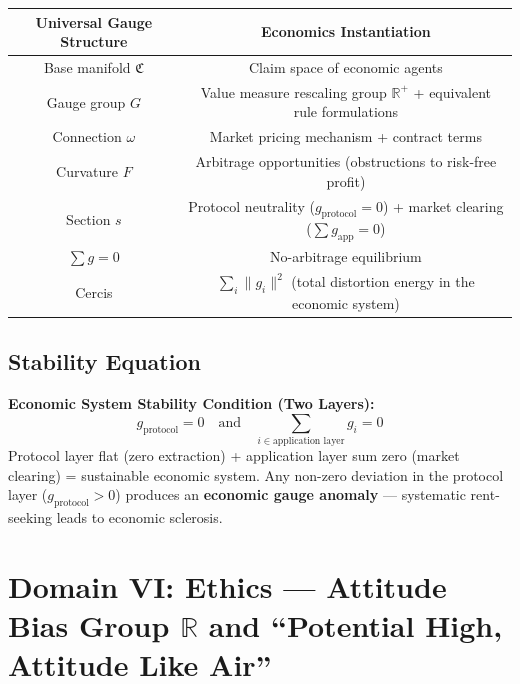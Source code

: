 \documentclass[12pt,a4paper]{article}
\theoremstyle{plain}
\theoremstyle{definition}
\newcommand{\R}{\mathbb{R}}
\newcommand{\curv}{F}
\newcommand{\conn}{\omega}
\newcommand{\ClaimSpace}{\mathfrak{C}}
\begin{document}
\begin{center}
\begin{tabular}{c|c}
    \toprule
    \textbf{Universal Gauge Structure} & \textbf{Economics Instantiation} \\
    \midrule
    Base manifold $\ClaimSpace$ & Claim space of economic agents \\
    Gauge group $G$ & Value measure rescaling group $\R^+$ + equivalent rule formulations \\
    Connection $\conn$ & Market pricing mechanism + contract terms \\
    Curvature $\curv$ & Arbitrage opportunities (obstructions to risk-free profit) \\
    Section $s$ & Protocol neutrality ($g_{\text{protocol}}=0$) + market clearing ($\sum g_{\text{app}}=0$) \\
    $\sum g = 0$ & No-arbitrage equilibrium \\
    Cercis & $\sum_i \|g_i\|^2$ (total distortion energy in the economic system) \\
    \bottomrule
\end{tabular}
\end{center}

\subsection{Stability Equation}

\begin{keyeq}
\textbf{Economic System Stability Condition (Two Layers):}
\begin{equation}
    \boxed{g_{\text{protocol}} = 0 \quad \text{and} \quad \sum_{i \in \text{application layer}} g_i = 0}
\end{equation}
Protocol layer flat (zero extraction) + application layer sum zero (market clearing) = sustainable economic system.
Any non-zero deviation in the protocol layer ($g_{\text{protocol}} > 0$) produces an \textbf{economic gauge anomaly} —
systematic rent-seeking leads to economic sclerosis.
\end{keyeq}

\newpage


\section{Domain VI: Ethics — Attitude Bias Group $\R$ and ``Potential High, Attitude Like Air''}
\end{document}
